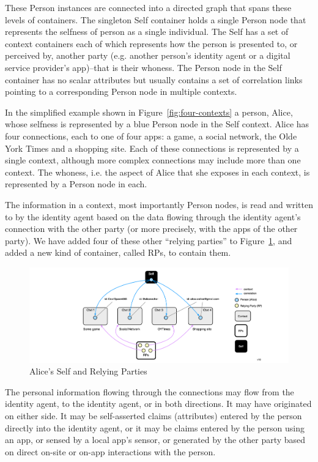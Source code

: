 \documentclass[11pt, oneside]{article}   	%
\begin{document}
These Person instances are connected into a directed graph that spans these  levels of containers. The singleton Self container holds a single Person node that represents the selfness of person as a single individual. The Self has a set of context containers each of which represents how the person is presented to, or perceived by, another party (e.g. another person's identity agent or a digital service provider's app)--that is their whoness. The Person node in the Self container has no scalar attributes but usually contains a set of correlation links pointing to a corresponding Person node in multiple contexts.

In the simplified example shown in Figure~\ref{fig:four-contexts} a person, Alice, whose selfness is represented by a blue Person node in the Self context. Alice has four connections, each to one of four apps: a game, a social network, the Olde York Times and a shopping site. Each of these connections is represented by a single context, although more complex connections may include more than one context. The whoness, i.e. the aspect of Alice that she exposes in each context, is represented by a Person node in each.

The information in a context, most importantly Person nodes, is read and written to by the identity agent based on the data flowing through the identity agent's connection with the other party (or more precisely, with the apps of the other party). We have added four of these other ``relying parties'' to Figure~\ref{fig:RPs-container}, and added a new kind of container, called RPs, to contain them. 

\begin{figure}[h!]
\includegraphics[width=\textwidth]{./images/example2.png}
\caption{Alice's Self and Relying Parties}
\label{fig:RPs-container}
\end{figure}

The personal information flowing through the connections may flow from the identity agent, to the identity agent, or in both directions. It may have originated on either side. It may be self-asserted claims (attributes) entered by the person directly into the identity agent, or it may be claims entered by the person using an app, or sensed by a local app's sensor, or generated by the other party based on direct on-site or on-app interactions with the person.
\end{document}

